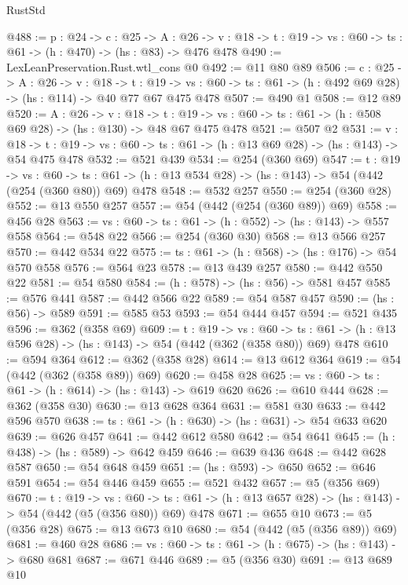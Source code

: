 \begin{lexlean}{RustStd}
\begin{coremodule}
@488 := {p : @24} ->
  {c : @25} ->
  {A : @26} ->
  {v : @18} -> {t : @19} -> {vs : @60} -> {ts : @61} -> (h : @470) -> (hs : @83) -> @476 @478
@490 := LexLeanPreservation.Rust.wtl_cons @0
@492 := @11 @80 @89
@506 := {c : @25} ->
  {A : @26} ->
  {v : @18} ->
  {t : @19} ->
  {vs : @60} -> {ts : @61} -> (h : @492 @69 @28) -> (hs : @114) -> @40 @77 @67 @475 @478
@507 := @490 @1
@508 := @12 @89
@520 := {A : @26} ->
  {v : @18} ->
  {t : @19} -> {vs : @60} -> {ts : @61} -> (h : @508 @69 @28) -> (hs : @130) -> @48 @67 @475 @478
@521 := @507 @2
@531 := {v : @18} ->
  {t : @19} -> {vs : @60} -> {ts : @61} -> (h : @13 @69 @28) -> (hs : @143) -> @54 @475 @478
@532 := @521 @439
@534 := @254 (@360 @69)
@547 := {t : @19} ->
  {vs : @60} ->
  {ts : @61} -> (h : @13 @534 @28) -> (hs : @143) -> @54 (@442 (@254 (@360 @80)) @69) @478
@548 := @532 @257
@550 := @254 (@360 @28)
@552 := @13 @550 @257
@557 := @54 (@442 (@254 (@360 @89)) @69)
@558 := @456 @28
@563 := {vs : @60} -> {ts : @61} -> (h : @552) -> (hs : @143) -> @557 @558
@564 := @548 @22
@566 := @254 (@360 @30)
@568 := @13 @566 @257
@570 := @442 @534 @22
@575 := {ts : @61} -> (h : @568) -> (hs : @176) -> @54 @570 @558
@576 := @564 @23
@578 := @13 @439 @257
@580 := @442 @550 @22
@581 := @54 @580
@584 := (h : @578) -> (hs : @56) -> @581 @457
@585 := @576 @441
@587 := @442 @566 @22
@589 := @54 @587 @457
@590 := (hs : @56) -> @589
@591 := @585 @53
@593 := @54 @444 @457
@594 := @521 @435
@596 := @362 (@358 @69)
@609 := {t : @19} ->
  {vs : @60} ->
  {ts : @61} -> (h : @13 @596 @28) -> (hs : @143) -> @54 (@442 (@362 (@358 @80)) @69) @478
@610 := @594 @364
@612 := @362 (@358 @28)
@614 := @13 @612 @364
@619 := @54 (@442 (@362 (@358 @89)) @69)
@620 := @458 @28
@625 := {vs : @60} -> {ts : @61} -> (h : @614) -> (hs : @143) -> @619 @620
@626 := @610 @444
@628 := @362 (@358 @30)
@630 := @13 @628 @364
@631 := @581 @30
@633 := @442 @596 @570
@638 := {ts : @61} -> (h : @630) -> (hs : @631) -> @54 @633 @620
@639 := @626 @457
@641 := @442 @612 @580
@642 := @54 @641
@645 := (h : @438) -> (hs : @589) -> @642 @459
@646 := @639 @436
@648 := @442 @628 @587
@650 := @54 @648 @459
@651 := (hs : @593) -> @650
@652 := @646 @591
@654 := @54 @446 @459
@655 := @521 @432
@657 := @5 (@356 @69)
@670 := {t : @19} ->
  {vs : @60} ->
  {ts : @61} -> (h : @13 @657 @28) -> (hs : @143) -> @54 (@442 (@5 (@356 @80)) @69) @478
@671 := @655 @10
@673 := @5 (@356 @28)
@675 := @13 @673 @10
@680 := @54 (@442 (@5 (@356 @89)) @69)
@681 := @460 @28
@686 := {vs : @60} -> {ts : @61} -> (h : @675) -> (hs : @143) -> @680 @681
@687 := @671 @446
@689 := @5 (@356 @30)
@691 := @13 @689 @10

\end{coremodule}
\end{lexlean}
